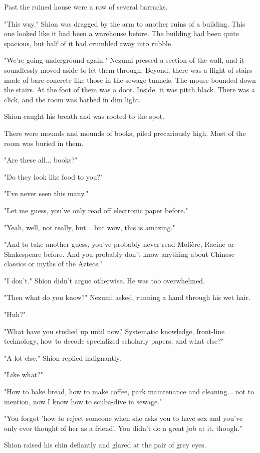 Past the ruined house were a row of several barracks.

"This way." Shion was dragged by the arm to another ruins of a building.
This one looked like it had been a warehouse before. The building had
been quite spacious, but half of it had crumbled away into rubble.

"We're going underground again." Nezumi pressed a section of the wall,
and it soundlessly moved aside to let them through. Beyond, there was a
flight of stairs made of bare concrete like those in the sewage tunnels.
The mouse bounded down the stairs. At the foot of them was a door.
Inside, it was pitch black. There was a click, and the room was bathed
in dim light.

Shion caught his breath and was rooted to the spot.

There were mounds and mounds of books, piled precariously high. Most of
the room was buried in them.

"Are these all... books?"

"Do they look like food to you?"

"I've never seen this many."

"Let me guess, you've only read off electronic paper before."

"Yeah, well, not really, but... but wow, this is amazing."

"And to take another guess, you've probably never read Molière, Racine
or Shakespeare before. And you probably don't know anything about
Chinese classics or myths of the Aztecs."

"I don't." Shion didn't argue otherwise. He was too overwhelmed.

"Then what do you know?" Nezumi asked, running a hand through his wet
hair.

"Huh?"

"What have you studied up until now? Systematic knowledge, front-line
technology, how to decode specialized scholarly papers, and what else?"

"A lot else," Shion replied indignantly.

"Like what?"

"How to bake bread, how to make coffee, park maintenance and cleaning...
not to mention, now I know how to scuba-dive in sewage."

"You forgot 'how to reject someone when she asks you to have sex and
you've only ever thought of her as a friend'. You didn't do a great job
at it, though."

Shion raised his chin defiantly and glared at the pair of grey eyes.

